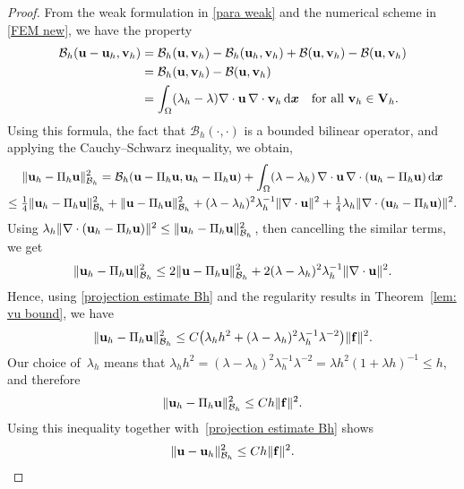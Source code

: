 \documentclass[11pt]{article}
\newcommand{\calB}{\mathcal{B}}
\newcommand{\vf}{{\bf f}}
\newcommand{\vu}{{\bf u}}
\newcommand{\vv}{{\bf v}}
\newcommand{\vV}{{\bf V}}
\newcommand{\bsx}{{\boldsymbol{x}}}
\numberwithin{equation}{section}
\newcommand{\ud}{\mathrm{d}}
\begin{document}
\begin{proof} 
From the weak formulation in \eqref{para weak} and the numerical scheme   in \eqref{FEM new}, we have the property 
\begin{align}\label{equ:Gal ort}
\calB_h(\vu-\vu_h, \vv_h) &= \calB_h(\vu, \vv_h)
    -\calB_h(\vu_h,\vv_h)+\calB(\vu,\vv_h)-\calB(\vu,\vv_h) \nonumber \\
&=\calB_h(\vu,\vv_h)-\calB(\vu,\vv_h)  \nonumber \\
&=\int_\Omega(\lambda_h-\lambda)\nabla\cdot\vu\,\nabla\cdot\vv_h\,\ud\bsx
\quad\text{for all $\vv_h \in \vV_h$.}
\end{align}
Using this formula, the fact that $\calB_h(\cdot, \cdot)$ is a bounded
bilinear operator, and applying the Cauchy--Schwarz inequality, we obtain,
\begin{multline*}
\|\vu_h-\Pi_h \vu\|_{\calB_h}^2=\calB_h(\vu-\Pi_h\vu,\vu_h-\Pi_h\vu)
    +\int_\Omega(\lambda-\lambda_h)\,\nabla\cdot\vu\,\nabla\cdot
    (\vu_h-\Pi_h\vu)\,\ud\bsx\\
    \le\tfrac14\|\vu_h-\Pi_h \vu\|_{\calB_h}^2+\|\vu-\Pi_h\vu\|_{\calB_h}^2
    +(\lambda-\lambda_h)^2\lambda_h^{-1}\|\nabla\cdot\vu\|^2
    +\tfrac{1}{4}\lambda_h\|\nabla\cdot(\vu_h-\Pi_h\vu)\|^2.
\end{multline*}
Using $\lambda_h\|\nabla\cdot(\vu_h-\Pi_h\vu)\|^2
\le\|\vu_h-\Pi_h\vu\|_{\calB_h}^2$, then cancelling the similar terms, we get
\[
\|\vu_h-\Pi_h\vu\|_{\calB_h}^2\le2\|\vu-\Pi_h\vu\|_{\calB_h}^2
    +2(\lambda-\lambda_h)^2\lambda_h^{-1}\|\nabla\cdot\vu\|^2.
\]
Hence, using \eqref{projection estimate Bh} and the regularity results in
Theorem~\ref{lem: vu bound},  we have
\[
\|\vu_h-\Pi_h \vu\|_{\calB_h}^2\le C\bigl(\lambda_hh^2
    +(\lambda-\lambda_h)^2\lambda_h^{-1}\lambda^{-2}\bigr)\|\vf\|^2.
\]
Our choice of~$\lambda_h$ means that
$\lambda_h h^2=(\lambda-\lambda_h)^2\lambda_h^{-1}\lambda^{-2}
    =\lambda h^2(1+\lambda h)^{-1}\le h$, and therefore
\begin{equation}\label{eq: uh Pih u}
\|\vu_h-\Pi_h \vu\|_{\calB_h}^2 \le Ch\|\vf\|^2.
\end{equation}
Using this inequality together with~\eqref{projection estimate Bh} shows
\begin{equation}\label{h1 error}
   \|\vu-\vu_h\|_{\calB_h}^2 \le Ch\|\vf\|^2.
\end{equation}


\end{proof}
\end{document}
